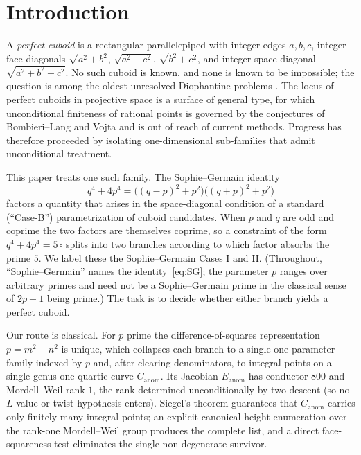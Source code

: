 \documentclass[11pt,reqno]{amsart}
\theoremstyle{plain}
\theoremstyle{definition}
\newcommand{\Eanom}{E_{\mathrm{anom}}}
\newcommand{\Canom}{C_{\mathrm{anom}}}
\begin{document}
\section{Introduction}

A \emph{perfect cuboid} is a rectangular parallelepiped with integer edges
$a,b,c$, integer face diagonals $\sqrt{a^{2}+b^{2}}$, $\sqrt{a^{2}+c^{2}}$,
$\sqrt{b^{2}+c^{2}}$, and integer space diagonal $\sqrt{a^{2}+b^{2}+c^{2}}$. No such
cuboid is known, and none is known to be impossible; the question is among the oldest
unresolved Diophantine problems \cite{Guy}. The locus of perfect cuboids in projective
space is a surface of general type, for which unconditional finiteness of rational
points is governed by the conjectures of Bombieri--Lang and Vojta and is out of reach
of current methods. Progress has therefore proceeded by isolating one-dimensional
sub-families that admit unconditional treatment.

This paper treats one such family. The Sophie--Germain identity
\[
q^{4}+4p^{4}=\bigl((q-p)^{2}+p^{2}\bigr)\bigl((q+p)^{2}+p^{2}\bigr)
\]
factors a quantity that arises in the space-diagonal condition of a standard
(``Case-B'') parametrization of cuboid candidates. When $p$ and $q$ are odd and
coprime the two factors are themselves coprime, so a constraint of the form
$q^{4}+4p^{4}=5\,\square$ splits into two branches according to which factor absorbs
the prime $5$. We label these the Sophie--Germain Cases I and II. (Throughout, ``Sophie--Germain''
names the identity~\eqref{eq:SG}; the parameter $p$ ranges over arbitrary primes and need
not be a Sophie--Germain prime in the classical sense of $2p+1$ being prime.) The task is
to decide whether either branch yields a perfect cuboid.

Our route is classical. For $p$ prime the difference-of-squares representation
$p=m^{2}-n^{2}$ is unique, which collapses each branch to a single one-parameter family
indexed by $p$ and, after clearing denominators, to integral points on a single
genus-one quartic curve $\Canom$. Its Jacobian $\Eanom$ has conductor $800$ and
Mordell--Weil rank $1$, the rank determined unconditionally by two-descent (so no
$L$-value or twist hypothesis enters). Siegel's theorem \cite{Siegel} guarantees that
$\Canom$ carries only finitely many integral points; an explicit canonical-height
enumeration over the rank-one Mordell--Weil group produces the complete list, and a
direct face-squareness test eliminates the single non-degenerate survivor.
\end{document}
